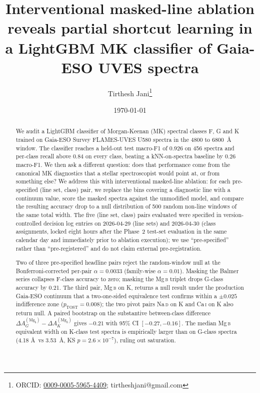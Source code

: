 \documentclass[11pt,a4paper]{article}
\title{Interventional masked-line ablation reveals partial shortcut learning in a LightGBM MK classifier of Gaia-ESO UVES spectra}
\author[1]{Tirthesh Jani\thanks{ORCID: \href{https://orcid.org/0009-0005-5965-4409}{0009-0005-5965-4409}; tirtheshjani@gmail.com}}
\affil[1]{Independent researcher, Barrie, Ontario, Canada}
\date{\today}
\newcommand{\Mgb}{Mg\,\textsc{b}\xspace}
\newcommand{\NaD}{Na\,\textsc{d}\xspace}
\newcommand{\CaI}{Ca\,\textsc{i}\xspace}
\newcommand{\dA}{\Delta A}
\begin{document}
\maketitle

\begin{abstract}
\noindent We audit a LightGBM classifier of Morgan-Keenan (MK) spectral classes F, G and K trained on Gaia-ESO Survey FLAMES-UVES U580 spectra in the 4800 to 6800~\AA{} window. The classifier reaches a held-out test macro-F1 of 0.926 on 456 spectra and per-class recall above 0.84 on every class, beating a kNN-on-spectra baseline by 0.26 macro-F1. We then ask a different question: does that performance come from the canonical MK diagnostics that a stellar spectroscopist would point at, or from something else? We address this with interventional masked-line ablation: for each pre-specified (line set, class) pair, we replace the bins covering a diagnostic line with a continuum value, score the masked spectra against the unmodified model, and compare the resulting accuracy drop to a null distribution of 500 random non-line windows of the same total width. The five (line set, class) pairs evaluated were specified in version-controlled decision log entries on 2026-04-29 (line sets) and 2026-04-30 (class assignments, locked eight hours after the Phase~2 test-set evaluation in the same calendar day and immediately prior to ablation execution); we use ``pre-specified'' rather than ``pre-registered'' and do not claim external pre-registration.

\noindent Two of three pre-specified headline pairs reject the random-window null at the Bonferroni-corrected per-pair $\alpha = 0.0033$ (family-wise $\alpha = 0.01$). Masking the Balmer series collapses F-class accuracy to zero; masking the \Mgb triplet drops G-class accuracy by 0.21. The third pair, \Mgb on K, returns a null result under the production Gaia-ESO continuum that a two-one-sided equivalence test confirms within a $\pm 0.025$ indifference zone ($p_{\mathrm{TOST}} = 0.008$); the two pivot pairs \NaD on K and \CaI on K also return null. A paired bootstrap on the substantive between-class difference $\dA_G^{(\mathrm{Mg}_b)} - \dA_K^{(\mathrm{Mg}_b)}$ gives $-0.21$ with 95\% CI $[-0.27, -0.16]$. The median \Mgb equivalent width on K-class test spectra is empirically larger than on G-class spectra (4.18 \AA\ vs 3.53~\AA, KS $p = 2.6 \times 10^{-7}$), ruling out saturation.


\end{abstract}
\end{document}
